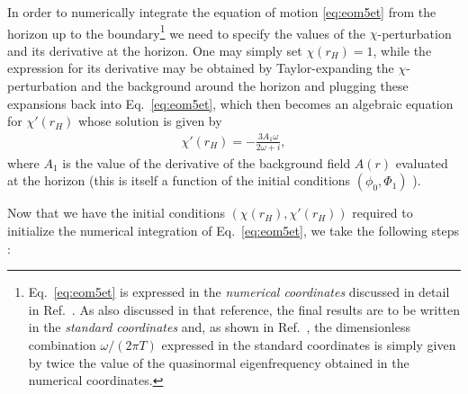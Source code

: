 \documentclass[aps,prd,showkeys,superscriptaddress,singlecolumn,nofootinbib,floatfix]{revtex4-1}
\begin{document}
In order to numerically integrate the equation of motion \eqref{eq:eom5et} from the horizon up to the boundary\footnote{Eq.\ \eqref{eq:eom5et} is expressed in the {\it numerical coordinates} discussed in detail in Ref.\ \cite{Critelli:2017oub}. As also discussed in that reference, the final results are to be written in the {\it standard coordinates} and, as shown in Ref.\ \cite{Finazzo:2015xwa}, the dimensionless combination $\omega/(2\pi T)$ expressed in the standard coordinates is simply given by twice the value of the quasinormal eigenfrequency obtained in the numerical coordinates.} we need to specify the values of the $\chi$-perturbation and its derivative at the horizon. One may simply set $\chi(r_H)=1$, while the expression for its derivative may be obtained by Taylor-expanding the $\chi$-perturbation and the background around the horizon and plugging these expansions back into Eq.\ \eqref{eq:eom5et}, which then becomes an algebraic equation for $\chi'(r_H)$ whose solution is given by \cite{Rougemont:2015wca}
\begin{align}
\chi'(r_H) = -\frac{3 A_1 \omega }{2 \omega +i},
\label{eq:chi1num}
\end{align}
where $A_1$ is the value of the derivative of the background field $A(r)$ evaluated at the horizon (this is itself a function of the initial conditions $(\phi_0,\Phi_1)$ \cite{Critelli:2017oub}).

Now that we have the initial conditions $(\chi(r_H),\chi'(r_H))$ required to initialize the numerical integration of Eq.\ \eqref{eq:eom5et}, we take the following steps \cite{Rougemont:2015wca}:
\end{document}
